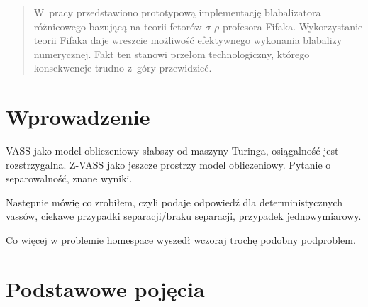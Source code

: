 \newtheorem{defi}{Definicja}[section]




    \maketitle

    \begin{abstract}
        W~pracy przedstawiono prototypową implementację blabalizatora
        różnicowego bazującą na teorii fetorów $\sigma$-$\rho$ profesora
        Fifaka. Wykorzystanie teorii Fifaka daje wreszcie możliwość
        efektywnego wykonania blabalizy numerycznej. Fakt ten stanowi
        przełom technologiczny, którego konsekwencje trudno z~góry
        przewidzieć.
    \end{abstract}

    \tableofcontents

    \chapter*{Wprowadzenie}
%
    VASS jako model obliczeniowy słabszy od maszyny Turinga, osiągalność jest rozstrzygalna.
    Z-VASS jako jeszcze prostrzy model obliczeniowy.
    Pytanie o separowalność, znane wyniki.

    Następnie mówię co zrobiłem, czyli podaje odpowiedź dla deterministycznych vassów, ciekawe przypadki separacji/braku separacji, przypadek jednowymiarowy.


    Co więcej w problemie homespace wyszedł wczoraj trochę podobny podproblem.


    \chapter{Podstawowe pojęcia}\label{r:pojecia}


